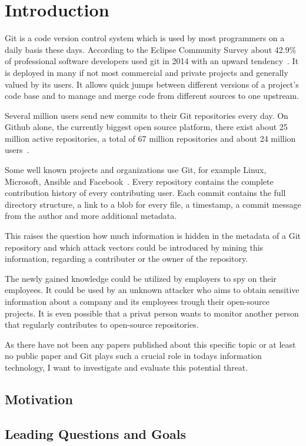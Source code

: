 \chapter{Introduction}

Git is a code version control system which is used by most programmers on a daily basis these days.
According to the Eclipse Community Survey about 42.9\% of professional software developers used git in 2014 with an upward tendency~\cite{article:git-popularity}.
It is deployed in many if not most commercial and private projects and generally valued by its users.
It allows quick jumps between different versions of a project's code base and to manage and merge code from different sources to one upstream.

Several million users send new commits to their Git repositories every day.
On Github alone, the currently biggest open source platform, there exist about 25 million active repositories, a total of 67 million repositories and about 24 million users~\cite{article:github-statistics}.

Some well known projects and organizations use Git, for example Linux, Microsoft, Ansible and Facebook~\cite{article:github-statistics}.
Every repository contains the complete contribution history of every contributing user.
Each commit contains the full directory structure, a link to a blob for every file, a timestamp, a commit message from the author and more additional metadata.

This raises the question how much information is hidden in the metadata of a Git repository and which attack vectors could be introduced by mining this information, regarding a contributer or the owner of the repository.

The newly gained knowledge could be utilized by employers to spy on their employees.
It could be used by an unknown attacker who aims to obtain sensitive information about a company and its employees trough their open-source projects.
It is even possible that a privat person wants to monitor another person that regularly contributes to open-source repositories.

As there have not been any papers published about this specific topic or at least no public paper and Git plays such a crucial role in todays information technology, I want to investigate and evaluate this potential threat.

\section{Motivation}

\section{Leading Questions and Goals}
